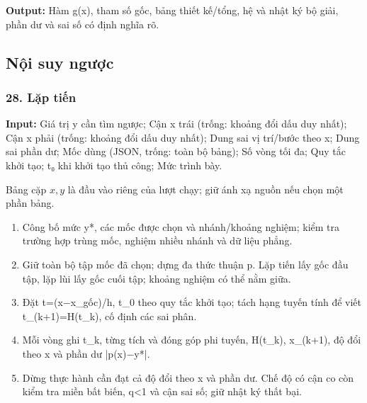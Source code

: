 \textbf{Output:} Hàm g(\allowbreak{}x),\allowbreak{} tham số gốc,\allowbreak{} bảng thiết kế/\allowbreak{}tổng,\allowbreak{} hệ và nhật ký bộ giải,\allowbreak{} phần dư và sai số có định nghĩa rõ.

\subsection{Nội suy ngược}

\examplebreak\subsubsection*{28. Lặp tiến}

\textbf{Input:} Giá trị y cần tìm ngược;\allowbreak{} Cận x trái (\allowbreak{}trống: khoảng đổi dấu duy nhất);\allowbreak{} Cận x phải (\allowbreak{}trống: khoảng đổi dấu duy nhất);\allowbreak{} Dung sai vị trí/\allowbreak{}bước theo x;\allowbreak{} Dung sai phần dư;\allowbreak{} Mốc dùng (\allowbreak{}JSON,\allowbreak{} trống: toàn bộ bảng);\allowbreak{} Số vòng tối đa;\allowbreak{} Quy tắc khởi tạo;\allowbreak{} t₀ khi khởi tạo thủ công;\allowbreak{} Mức trình bày.

Bảng cặp $x,y$ là đầu vào riêng của lượt chạy; giữ ánh xạ nguồn nếu chọn một phần bảng.

\begin{enumerate}

\item Công bố mức y*,\allowbreak{} các mốc được chọn và nhánh/\allowbreak{}khoảng nghiệm;\allowbreak{} kiểm tra trường hợp trùng mốc,\allowbreak{} nghiệm nhiều nhánh và dữ liệu phẳng.

\item Giữ toàn bộ tập mốc đã chọn;\allowbreak{} dựng đa thức thuận p. Lặp tiến lấy gốc đầu tập,\allowbreak{} lặp lùi lấy gốc cuối tập;\allowbreak{} khoảng nghiệm có thể nằm giữa.

\item Đặt t=\allowbreak{}(\allowbreak{}x\ensuremath{-}x\_gốc)/\allowbreak{}h,\allowbreak{} t\_0 theo quy tắc khởi tạo;\allowbreak{} tách hạng tuyến tính để viết t\_(\allowbreak{}k+\allowbreak{}1)=\allowbreak{}H(\allowbreak{}t\_k),\allowbreak{} cố định các sai phân.

\item Mỗi vòng ghi t\_k,\allowbreak{} từng tích và đóng góp phi tuyến,\allowbreak{} H(\allowbreak{}t\_k),\allowbreak{} x\_(\allowbreak{}k+\allowbreak{}1),\allowbreak{} độ đổi theo x và phần dư |p(\allowbreak{}x)\ensuremath{-}y*|.

\item Dừng thực hành cần đạt cả độ đổi theo x và phần dư. Chế độ có cận co còn kiểm tra miền bất biến,\allowbreak{} q<1 và cận sai số;\allowbreak{} giữ nhật ký thất bại.

\end{enumerate}


